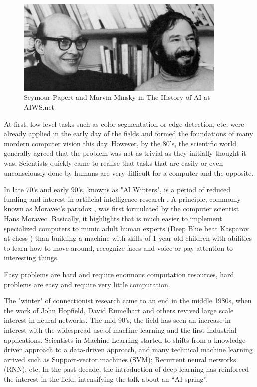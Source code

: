\documentclass[12pt]{article}
\begin{document}
\begin{figure}[htp]
    \centering
    \includegraphics[width=0.9\textwidth]{images/minsky_papert.jpg}
    \caption{Seymour Papert and Marvin Minsky in The History of AI at AIWS.net}
    \label{fig:papert_minsky}
\end{figure}

At first, low-level tasks such as color segmentation or edge detection, etc, were already 
applied in the early day of the fields and formed the foundations of many mordern computer
vision this day. However, by the 80's, the scientific world generally agreed that the 
problem was not as trivial as they initially thought it was. Scientists quickly came to 
realise that tasks that are easily or even unconsciously done by humans are very difficult 
for a computer and the opposite. 

In late 70's and early 90's, knowns as "AI Winters", is a period of reduced funding and 
interest in artificial intelligence research \cite{aiwinter}. A principle, commonly known 
as Moravec’s paradox \cite{agrawal2010study}, was first formulated by the computer scientist 
Hans Moravec. Basically, it highlights that is much easier to implement specialized computers 
to mimic adult human experts (Deep Blue beat Kasparov at chess \cite{deepblue}) than building a 
machine with skills of 1-year old children with abilities to learn how to move around, 
recognize faces and voice or pay attention to interesting things. 

\begin{displayquote}
    Easy problems are hard and require enormous computation resources, 
    hard problems are easy and require very little computation. 
\end{displayquote}

The "winter" of connectionist research came to an end in the middle 1980s, 
when the work of John Hopfield, David Rumelhart and others revived large scale interest 
in neural networks. The mid 90's, the field has seen an increase in interest with the 
widespread use of machine learning and the first industrial applications. Scientists in Machine Learning started to 
shifts from a knowledge-driven approach to a data-driven approach, and many technical machine 
learning arrived such as Support-vector machines (SVM); Recurrent neural networks (RNN); etc.\cite{708428,medsker2001recurrent}
In the past decade, the introduction of deep learning has reinforced the interest in the field, 
intensifying the talk about an “AI spring”.
\end{document}

